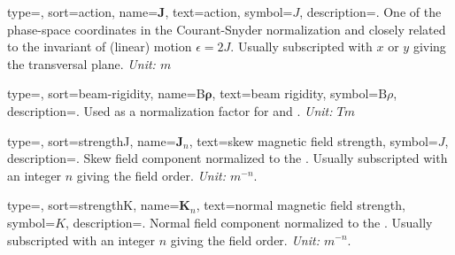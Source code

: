 {
    type=\symboltype,
    sort={action},
    name={$\bm J$},
    text={action},
    symbol={\ensuremath{J}},
    description={.
    One of the phase-space coordinates in the Courant-Snyder normalization
    and closely related to the invariant of (linear) motion $\epsilon = 2J$. 
    Usually subscripted with $x$ or $y$ giving the transversal plane.
    \textit{Unit: $m$}%
    }
}

{
    type=\symboltype,
    sort={beam-rigidity},
    name={B$\bm \rho$},
    text={beam rigidity},
    symbol={\ensuremath{\mathrm{B}\rho}},
    description={.
    Used as a normalization factor for  and . 
    \textit{Unit: $Tm$}%
    }
}

{
    type=\symboltype,
    sort={strengthJ},
    name={$\bm J_n$},
    text={skew magnetic field strength},
    symbol={\ensuremath{J}},
    description={.
    Skew field component normalized to the .
    Usually subscripted with an integer $n$ giving the field order.
    \textit{Unit: $m^{-n}$}.\\
    }
}

{
    type=\symboltype,
    sort={strengthK},
    name={$\bm K_n$},
    text={normal magnetic field strength},
    symbol={\ensuremath{K}},
    description={.
    Normal field component normalized to the .
    Usually subscripted with an integer $n$ giving the field order.
    \textit{Unit: $m^{-n}$}.\\
    }
}
